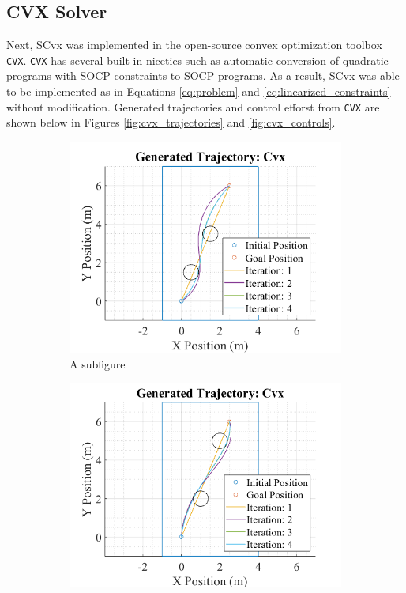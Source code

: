 \documentclass{article}
\begin{document}
\subsection{CVX Solver}

Next, SCvx was implemented in the open-source convex optimization toolbox \texttt{CVX}.
\texttt{CVX} has several built-in niceties such as automatic conversion of quadratic programs with SOCP constraints to SOCP programs.
As a result, SCvx was able to be implemented as in Equations \ref{eq:problem} and \ref{eq:linearized_constraints} without modification.
Generated trajectories and control efforst from \texttt{CVX} are shown below in Figures \ref{fig:cvx_trajectories} and \ref{fig:cvx_controls}.

\begin{figure}[H]
  \centering
  \begin{subfigure}{.5\textwidth}
    \centering
    \includegraphics[width=\linewidth]{images/cvx/traj1_trajectories.png}
    \caption{A subfigure}
    \label{fig:cvx_traj1}
  \end{subfigure}%
  \begin{subfigure}{.5\textwidth}
    \centering
    \includegraphics[width=\linewidth]{images/cvx/traj2_trajectories.png}

\end{subfigure}
\end{figure}
\end{document}
